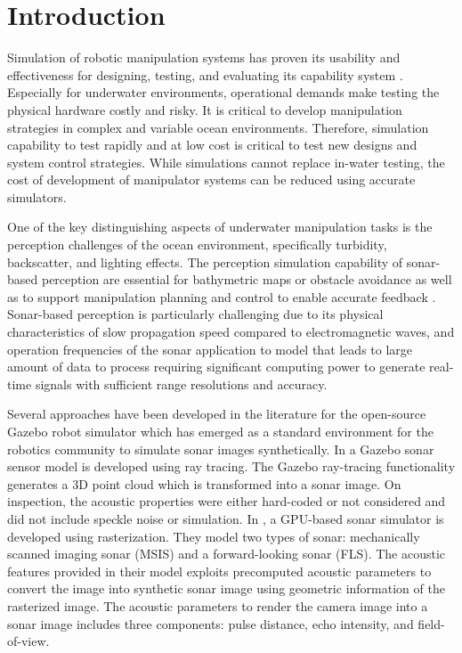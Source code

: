 \documentclass[utf8]{frontiersSCNS} %
\begin{document}
\section{Introduction}
Simulation of robotic manipulation systems has proven its usability and effectiveness for designing, testing, and evaluating its capability system \citep{cook2014survey}. Especially for underwater environments, operational demands make testing the physical hardware costly and risky. It is critical to develop manipulation strategies in complex and variable ocean environments. Therefore, simulation capability to test rapidly and at low cost is critical to test new designs and system control strategies. While simulations cannot replace in-water testing, the cost of development of manipulator systems can be reduced using accurate simulators.

One of the key distinguishing aspects of underwater manipulation tasks is the perception challenges of the ocean environment, specifically turbidity, backscatter, and lighting effects. The perception simulation capability of sonar-based perception are essential for bathymetric maps or obstacle avoidance as well as to support manipulation planning and control to enable accurate feedback \citep{manhaes2016uuv}. Sonar-based perception is particularly challenging due to its physical characteristics of slow propagation speed compared to electromagnetic waves, and operation frequencies of the sonar application to model that leads to large amount of data to process requiring significant computing power to generate real-time signals with sufficient range resolutions and accuracy.

Several approaches have been developed in the literature for the open-source Gazebo robot simulator \citep{koenig04gazebo} which has emerged as a standard environment for the robotics community to simulate sonar images synthetically. In \cite{demarco15computationally} a Gazebo sonar sensor model is developed using ray tracing. The Gazebo ray-tracing functionality generates a 3D point cloud which is transformed into a sonar image. On inspection, the acoustic properties were either hard-coded or not considered and did not include speckle noise or simulation. In \cite{cerqueira17novel, cerqueira20rasterized}, a GPU-based sonar simulator is developed using rasterization. They model two types of sonar: mechanically scanned imaging sonar (MSIS) and a forward-looking sonar (FLS). The acoustic features provided in their model exploits precomputed acoustic parameters to convert the image into synthetic sonar image using geometric information of the rasterized image. The acoustic parameters to render the camera image into a sonar image includes three components: pulse distance, echo intensity, and field-of-view. 
\end{document}
